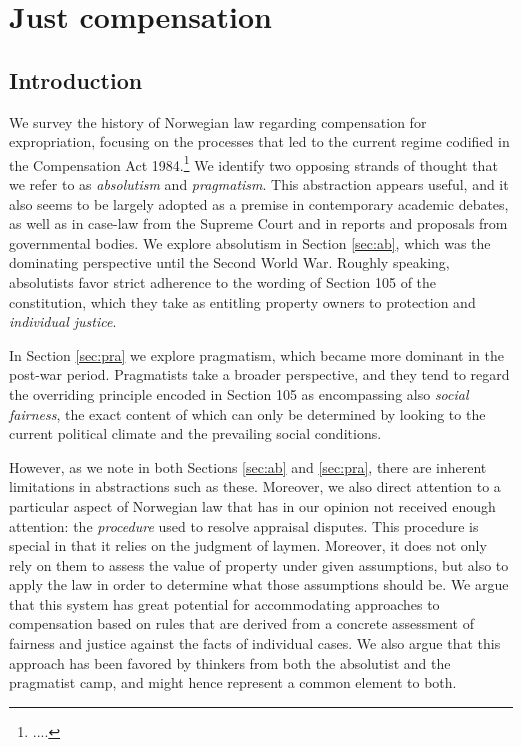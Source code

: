 \chapter{Just compensation}\label{chap:5}

\section{Introduction}\label{intro}

We survey the history of Norwegian law regarding compensation for expropriation, focusing on the processes that led to the current regime codified in the Compensation Act 1984.\footnote{....} We identify two opposing strands of thought that we refer to as \emph{absolutism} and \emph{pragmatism}. This abstraction appears useful, and it also seems to be largely adopted as a premise in contemporary academic debates, as well as in case-law from the Supreme Court and in reports and proposals from governmental bodies. We explore absolutism in Section \ref{sec:ab}, which was the dominating perspective until the Second World War. Roughly speaking, absolutists favor strict adherence to the wording of Section 105 of the constitution, which they take as entitling property owners to protection and \emph{individual justice}.  

In Section \ref{sec:pra} we explore pragmatism, which became more dominant in the post-war period. Pragmatists take a broader perspective, and they tend to regard the overriding principle encoded in Section 105 as encompassing also \emph{social fairness}, the exact content of which can only be determined by looking to the current political climate and the prevailing social conditions.

However, as we note in both Sections \ref{sec:ab} and \ref{sec:pra}, there are inherent limitations in abstractions such as these. Moreover, we also direct attention to a particular aspect of Norwegian law that has in our opinion not received enough attention: the \emph{procedure} used to resolve appraisal disputes. This procedure is special in that it relies on the judgment of laymen. Moreover, it does not only rely on them to assess the value of property under given assumptions, but also to apply the law in order to determine what those assumptions should be. We argue that  this system has great potential for accommodating approaches to compensation based on rules that are derived from a concrete assessment of fairness and justice against the facts of individual cases. We also argue that this approach has been favored by thinkers from both the absolutist and the pragmatist camp, and might hence represent a common element to both.

